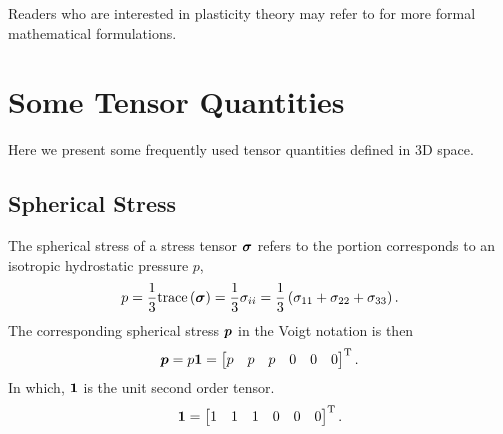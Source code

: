 Readers who are interested in plasticity theory may refer to \cite{Simo1998} for more formal mathematical formulations.
\section{Some Tensor Quantities}
Here we present some frequently used tensor quantities defined in 3D space.
\subsection{Spherical Stress}
The spherical stress of a stress tensor $\bm{\sigma}$ refers to the portion corresponds to an isotropic hydrostatic pressure $p$,
\begin{gather}
p=\dfrac{1}{3}\text{trace}\left(\bm{\sigma}\right)=\dfrac{1}{3}\sigma_{ii}=\dfrac{1}{3}\left(\sigma_{11}+\sigma_{22}+\sigma_{33}\right).
\end{gather}
The corresponding spherical stress $\bm{p}$ in the Voigt notation is then
\begin{gather}
\bm{p}=p\bm{1}=\begin{bmatrix}p&p&p&0&0&0\end{bmatrix}^{\mathrm{T}}.
\end{gather}
In which, $\bm{1}$ is the unit second order tensor.
\begin{gather}
\bm{1}=\begin{bmatrix}1&1&1&0&0&0\end{bmatrix}^{\mathrm{T}}.
\end{gather}
